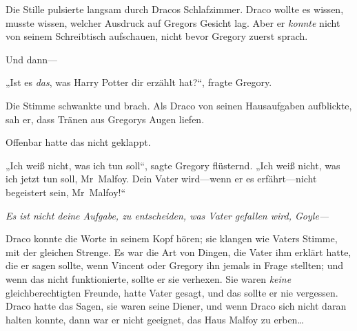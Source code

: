 Die Stille pulsierte langsam durch Dracos Schlafzimmer. Draco wollte es wissen, musste wissen, welcher Ausdruck auf Gregors Gesicht lag. Aber er \emph{konnte} nicht von seinem Schreibtisch aufschauen, nicht bevor Gregory zuerst sprach.

Und dann—

„Ist es \emph{das}, was Harry Potter dir erzählt hat?“, fragte Gregory.

Die Stimme schwankte und brach. Als Draco von seinen Hausaufgaben aufblickte, sah er, dass Tränen aus Gregorys Augen liefen.

Offenbar hatte das nicht geklappt.

„Ich weiß nicht, was ich tun soll“, sagte Gregory flüsternd. „Ich weiß nicht, was ich jetzt tun soll, Mr~Malfoy. Dein Vater wird—wenn er es erfährt—nicht begeistert sein, Mr~Malfoy!“

\emph{Es ist nicht \emph{deine} Aufgabe, zu entscheiden, was Vater gefallen wird, Goyle—}

Draco konnte die Worte in seinem Kopf hören; sie klangen wie Vaters Stimme, mit der gleichen Strenge. Es war die Art von Dingen, die Vater ihm erklärt hatte, die er sagen sollte, wenn Vincent oder Gregory ihn jemals in Frage stellten; und wenn das nicht funktionierte, sollte er sie verhexen. Sie waren \emph{keine} gleichberechtigten Freunde, hatte Vater gesagt, und das sollte er nie vergessen. Draco hatte das Sagen, sie waren seine Diener, und wenn Draco sich nicht daran halten konnte, dann war er nicht geeignet, das Haus Malfoy zu erben…

